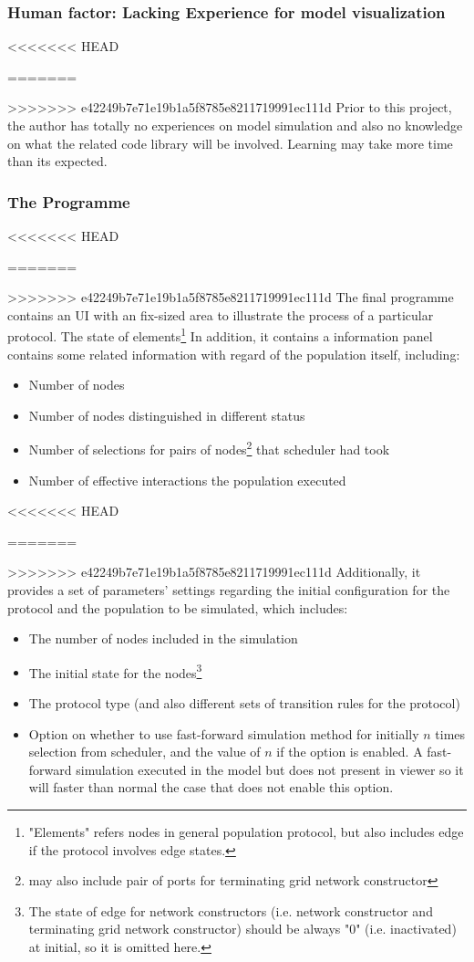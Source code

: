 \subsubsection{Human factor: Lacking Experience for model visualization}
<<<<<<< HEAD
\par\noindent
=======
\par
>>>>>>> e42249b7e71e19b1a5f8785e8211719991ec111d
Prior to this project, the author has totally no experiences on model simulation and
also no knowledge on what the related code library will be involved. Learning may take
more time than its expected.

\subsubsection{The Programme}
<<<<<<< HEAD
\par\noindent
=======
\par
>>>>>>> e42249b7e71e19b1a5f8785e8211719991ec111d
The final programme contains an UI with an fix-sized area to illustrate the process of
a particular protocol. The state of elements\footnote{\noindent "Elements" refers nodes in general population protocol,
but also includes edge if the protocol involves edge states.}
In addition, it contains a information panel contains some related
information with regard of the population itself, including:
\begin{itemize}
  \item Number of nodes
  \item Number of nodes distinguished in different status
  \item Number of selections for pairs of nodes\footnote{may also include pair of ports for terminating grid network constructor} that scheduler had took
  \item Number of effective interactions the population executed
\end{itemize}
<<<<<<< HEAD
\par\noindent
=======
\par
>>>>>>> e42249b7e71e19b1a5f8785e8211719991ec111d
Additionally, it provides a set of parameters' settings regarding the initial configuration for the protocol and the population to be simulated, which includes:
\begin{itemize}
  \item The number of nodes included in the simulation
  \item The initial state for the nodes\footnote{\noindent The state of edge for network constructors (i.e. network constructor and terminating grid network constructor) should be always "0" (i.e. inactivated) at initial, so it is omitted here.}
  \item The protocol type (and also different sets of transition rules for the protocol)
  \item Option on whether to use fast-forward simulation method for initially $n$ times selection from scheduler, and the value of $n$ if the option is enabled.
  A fast-forward simulation executed in the model but does not present in viewer so it will faster than normal the case that does not enable this option.
\end{itemize}

